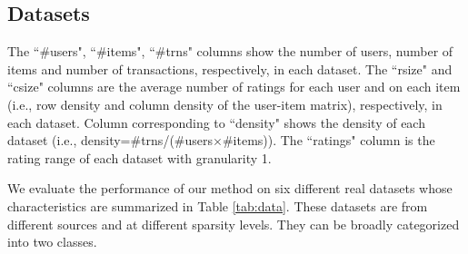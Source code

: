 \documentclass[letterpaper]{article}
\begin{document}
\subsection{Datasets}
\begin{table}[ht]
\caption{The datasets used in evaluation}
\label{tab:data}
\begin{center}
\tiny
{}
\begin{tablenotes}
\tiny
\item The ``\#users", ``\#items", ``\#trns" columns show the number of users, number of items and number of transactions, respectively, in each dataset. The ``rsize" and ``csize" columns are the average number of ratings for each user and on each item (i.e., row density and column density of the user-item matrix), respectively, in each dataset. Column corresponding to ``density" shows the density of each dataset (i.e., density=\#trns/(\#users$\times$\#items)). The ``ratings" column is the rating range of each dataset with granularity 1.
\end{tablenotes}
\end{center}
\end{table}
We evaluate the performance of our method on six different real datasets whose characteristics are summarized in Table \ref{tab:data}. These datasets are from different sources and at different sparsity levels. They can be broadly categorized into two classes.
\end{document}
